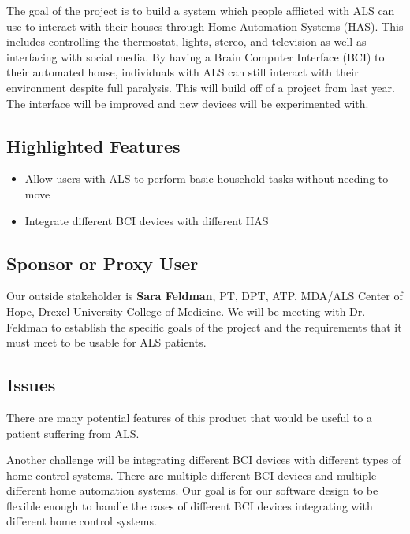 \documentclass{report}
\begin{document}
The goal of the project is to build a system which people afflicted with ALS
can use to interact with their houses through Home Automation Systems (HAS).
This includes controlling the thermostat, lights, stereo, and television as
well as interfacing with social media. By having a Brain Computer Interface
(BCI) to their automated house, individuals with ALS can still interact with
their environment despite full paralysis. This will build off of a project
from last year. The interface will be improved and new devices will be
experimented with.


\subsection*{Highlighted Features}

\begin{itemize}
\item Allow users with ALS to perform basic household tasks without needing to
    move
\item Integrate different BCI devices with different HAS
\end{itemize}

\subsection*{Sponsor or Proxy User}

Our outside stakeholder is \textbf{Sara Feldman}, PT, DPT, ATP, MDA/ALS Center
of Hope, Drexel University College of Medicine. We will be meeting with Dr.
Feldman to establish the specific goals of the project and the requirements
that it must meet to be usable for ALS patients.

\subsection*{Issues}

There are many potential features of this product that would be useful to a
patient suffering from ALS. 


Another challenge will be integrating different BCI devices with different
types of home control systems. There are multiple different BCI devices and
multiple different home automation systems. Our goal is for our software
design to be flexible enough to handle the cases of different BCI devices
integrating with different home control systems.
\end{document}

